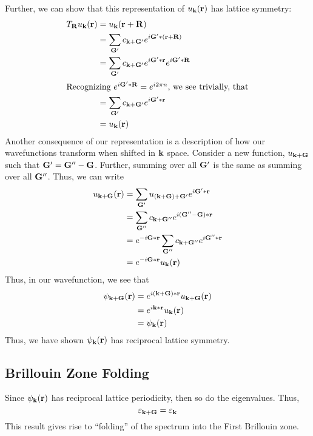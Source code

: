 Further, we can show that this representation of \(u_{\mathbf{k}}(\mathbf{r})\) has lattice symmetry:
\begin{align*}
	T_{\mathbf{R}} u_{\mathbf{k}}(\mathbf{r})&= u_{\mathbf{k}}(\mathbf{r}+\mathbf{R})\\
		  &= \sum_{\mathbf{G}'}c_{\mathbf{k}+\mathbf{G}'}e^{i\mathbf{G}'*(\mathbf{r}+\mathbf{R})}\\
		  &= \sum_{\mathbf{G}'}c_{\mathbf{k}+\mathbf{G}'}e^{i\mathbf{G}'*\mathbf{r}}e^{i\mathbf{G}'*\mathbf{R}}\\
		  \intertext{Recognizing \(e^{i\mathbf{G}'*\mathbf{R}} = e^{i2\pi n}\), we see trivially, that}
		  &= \sum_{\mathbf{G}'}c_{\mathbf{k}+\mathbf{G}'}e^{i\mathbf{G}'*\mathbf{r}}\\
		  &=u_{\mathbf{k}}(\mathbf{r})
\end{align*}
Another consequence of our representation is a description of how our wavefunctions transform when shifted in \(\mathbf{k}\) space. Consider a new function, \(u_{\mathbf{k}+\mathbf{G}}\) such that \(\mathbf{G}' = \mathbf{G}''-\mathbf{G}\). Further, summing over all \(\mathbf{G}'\) is the same as summing over all \(\mathbf{G}''\). Thus, we can write
\begin{align*}
	u_{\mathbf{k}+\mathbf{G}}(\mathbf{r})&=\sum_{\mathbf{G}'} u_{(\mathbf{k}+\mathbf{G})+\mathbf{G}'}e^{i\mathbf{G}'*\mathbf{r}}\\
			      &=\sum_{\mathbf{G}''} c_{\mathbf{k}+\mathbf{G}''}e^{i(\mathbf{G}''-\mathbf{G})*\mathbf{r}}\\
			      &=e^{-i\mathbf{G}*\mathbf{r}}\sum_{\mathbf{G}''}c_{\mathbf{k}+\mathbf{G}''}e^{i\mathbf{G}''*\mathbf{r}}\\
			      &=e^{-i\mathbf{G}*\mathbf{r}}u_{\mathbf{k}}(\mathbf{r})
\end{align*}
Thus, in our wavefunction, we see that
\begin{align*}
	\psi_{\mathbf{k}+\mathbf{G}}(\mathbf{r})&=e^{i(\mathbf{k}+\mathbf{G})*\mathbf{r}}u_{\mathbf{k}+\mathbf{G}}(\mathbf{r})\\
			       &= e^{i\mathbf{k}*\mathbf{r}}u_{\mathbf{k}}(\mathbf{r})\\
			       &=\psi_{\mathbf{k}}(\mathbf{r})
\end{align*}
Thus, we have shown \(\psi_{\mathbf{k}}(\mathbf{r})\) has reciprocal lattice symmetry.

\subsection{Brillouin Zone Folding}
Since \(\psi_{\mathbf{k}}(\mathbf{r})\) has reciprocal lattice periodicity, then so do the eigenvalues. Thus, 
\begin{equation}
	\varepsilon_{\mathbf{k}+\mathbf{G}} = \varepsilon_{\mathbf{k}}
\end{equation}
This result gives rise to ``folding'' of the spectrum into the First Brillouin zone.

